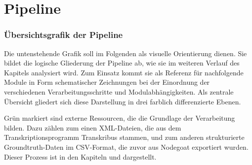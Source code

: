 \documentclass[12pt, a4paper, ngerman, bidi=default]{article}
\begin{document}



\section{Pipeline}

\subsubsection{Übersichtsgrafik der Pipeline}

Die untenstehende Grafik soll im Folgenden als visuelle Orientierung dienen. 
Sie bildet die logische Gliederung der Pipeline ab, wie sie im weiteren Verlauf des 
Kapitels analysiert wird. Zum Einsatz kommt sie als Referenz für nachfolgende Module in Form schematischer Zeichnungen bei der Einordnung der verschiedenen Verarbeitungsschritte und Modulabhängigkeiten. 
Als zentrale Übersicht gliedert sich diese Darstellung in drei farblich differenzierte Ebenen.

Grün markiert sind externe Ressourcen, die die Grundlage der Verarbeitung bilden. Dazu zählen 
zum einen XML-Dateien, die aus dem Transkriptionsprogramm Transkribus stammen, und zum anderen 
strukturierte Groundtruth-Daten im CSV-Format, die zuvor aus Nodegoat exportiert 
wurden. Dieser Prozess ist in den Kapiteln  und  dargestellt.
\end{document}
